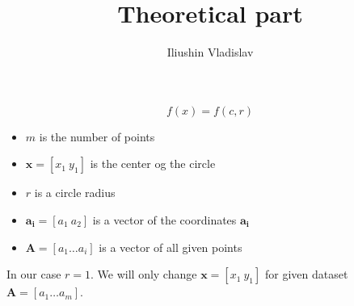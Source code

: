 \documentclass[]{scrartcl}
\title{Theoretical part}
\author{Iliushin Vladislav}
\begin{document}
\maketitle

 
\section{}

\begin{equation} \label{eq:main_function}
   f(x) = f(c, r) 
\end{equation}

 \begin{itemize}
 	\item $ m $ is the number of points
 	\item $ \mathbf{x} = [x_1 \: y_1] $ is the center og the circle
 	\item $ r $ is  a circle radius
 	\item $ \mathbf{a_i} = [a_1 \: a_2 ] $ is a vector of the coordinates  $\mathbf{a_i} $
 	\item $ \mathbf{A} = [a_1 \dots a_i] $ is a vector of all given points
 \end{itemize}
 In our case  $ r = 1 $.  We will only change $ \mathbf{x} = [x_1 \: y_1] $ for given dataset $ \mathbf{A} = [a_1 \dots a_m] $.

\newpage
\end{document}
